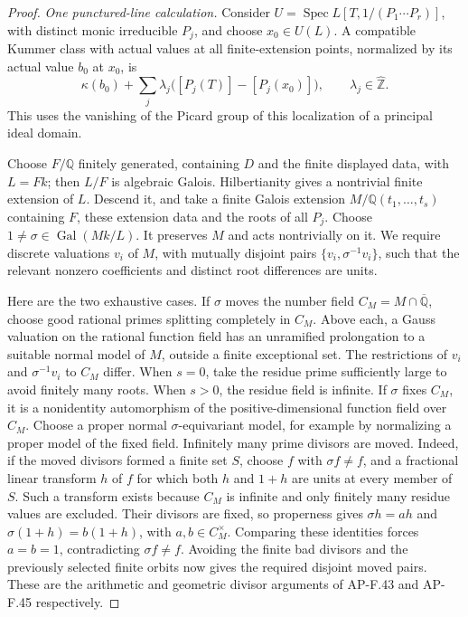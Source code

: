 \begin{proof}
\emph{One punctured-line calculation.}
Consider
\(U=\operatorname{Spec}L[T,1/(P_1\cdots P_r)]\), with distinct
monic irreducible \(P_j\), and choose \(x_0\in U(L)\).
A compatible Kummer class with actual values at all finite-extension
points, normalized by its actual value \(b_0\) at \(x_0\), is
\[
 \kappa(b_0)+\sum_j\lambda_j
             \bigl([P_j(T)]-[P_j(x_0)]\bigr),
                  \qquad\lambda_j\in\widehat{\mathbb Z}. \tag{FF.9.3}
\]
This uses the vanishing of the Picard group of this localization
of a principal ideal domain.

Choose \(F/\mathbb Q\) finitely generated, containing \(D\)
and the finite displayed data, with \(L=Fk\); then \(L/F\)
is algebraic Galois. Hilbertianity gives a nontrivial finite
extension of \(L\). Descend it, and take a finite Galois extension
\(M/\mathbb Q(t_1,\ldots,t_s)\) containing \(F\), these
extension data and the roots of all \(P_j\). Choose
\(1\ne\sigma\in\operatorname{Gal}(Mk/L)\). It preserves \(M\)
and acts nontrivially on it. We require discrete valuations
\(v_i\) of \(M\), with mutually disjoint pairs
\(\{v_i,\sigma^{-1}v_i\}\), such that the relevant nonzero coefficients and
distinct root differences are units.

Here are the two exhaustive cases. If \(\sigma\) moves the
number field \(C_M=M\cap\overline{\mathbb Q}\), choose good
rational primes splitting completely in \(C_M\). Above each,
a Gauss valuation on the rational function field has an unramified
prolongation to a suitable normal model of \(M\), outside a finite
exceptional set. The restrictions of \(v_i\) and
\(\sigma^{-1}v_i\) to \(C_M\) differ. When \(s=0\), take
the residue prime sufficiently large to avoid finitely many roots.
When \(s>0\), the residue field is infinite. If \(\sigma\)
fixes \(C_M\), it is a nonidentity automorphism of the
positive-dimensional function field over \(C_M\). Choose a proper
normal \(\sigma\)-equivariant model, for example by normalizing
a proper model of the fixed field. Infinitely many prime divisors
are moved. Indeed, if the moved divisors formed a finite set \(S\),
choose \(f\) with \(\sigma f\ne f\), and a fractional linear
transform \(h\) of \(f\) for which both \(h\) and \(1+h\)
are units at every member of \(S\). Such a transform exists
because \(C_M\) is infinite and only finitely many residue values
are excluded. Their divisors are fixed, so properness gives
\(\sigma h=ah\) and \(\sigma(1+h)=b(1+h)\), with
\(a,b\in C_M^\times\). Comparing these identities forces
\(a=b=1\), contradicting \(\sigma f\ne f\). Avoiding the
finite bad divisors and the previously selected finite orbits
now gives the required disjoint moved pairs. These are the arithmetic and geometric divisor
arguments of AP-F.43 and AP-F.45 respectively.


\end{proof}
